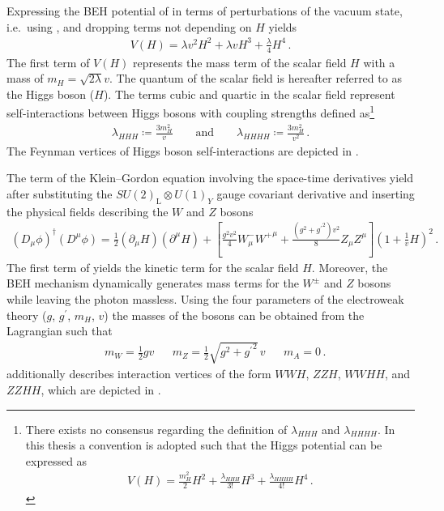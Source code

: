 Expressing the BEH potential of  in terms of
perturbations of the vacuum state, i.e.\ using ,
and dropping terms not depending on $H$ yields
\begin{align}
  V(H) =
  \lambda v^2 H^2
  + \lambda v H^3
  + \frac{\lambda}{4} H^4 \,\text{.}
  \label{eq:beh_potential}
\end{align}
The first term of $V(H)$ represents the mass term of the scalar field $H$ with a
mass of $m_H = \sqrt{2\lambda} v$. The quantum of the scalar field is hereafter
referred to as the Higgs boson ($H$). The terms cubic and quartic in the scalar
field represent self-interactions between Higgs bosons with coupling strengths
defined as\footnote{There exists no consensus regarding the definition of
  $\lambda_{HHH}$ and $\lambda_{HHHH}$. In this thesis a convention is adopted
  such that the Higgs potential can be expressed as
  \begin{align*}
    V(H) = \frac{m_{H}^2}{2} H^2 + \frac{\lambda_{HHH}}{3!} H^3 + \frac{\lambda_{HHHH}}{4!}
    H^4 \,\text{.}
  \end{align*}
}
\begin{align*}
  \lambda_{HHH} \coloneqq \frac{3 m_{H}^2}{v} \qquad \text{and} \qquad \lambda_{HHHH} \coloneqq \frac{3 m_{H}^2}{v^2} \,\text{.}
\end{align*}
The Feynman vertices of Higgs boson self-interactions are depicted in
.

The term of the Klein--Gordon equation involving the space-time derivatives
yield after substituting the $SU(2)_{\text{L}} \otimes U(1)_Y$ gauge covariant
derivative and inserting the physical fields describing the $W$ and $Z$ bosons
\begin{align}
  (D_\mu \phi)^\dagger (D^\mu \phi) =
  \frac{1}{2} (\partial_\mu H) (\partial^\mu H)
  + \left[
  \frac{g^2 v^2}{4} W^{-}_\mu {W^{+}}^\mu
  +
  \frac{(g^2 + {g^\prime}^2) v^2}{8} Z_\mu Z^\mu
  \right] \left( 1 + \frac{1}{v} H \right)^2 \,\text{.}
  \label{eq:higgs_covariant_derivative}
\end{align}
The first term of  yields the kinetic term
for the scalar field $H$. Moreover, the BEH mechanism dynamically generates mass
terms for the $W^\pm$ and $Z$ bosons while leaving the photon massless. Using
the four parameters of the electroweak theory ($g$, $g^\prime$, $m_{H}$, $v$)
the masses of the bosons can be obtained from the Lagrangian such that
\begin{align*}
  &m_W = \frac{1}{2} g v  &&m_Z = \frac{1}{2} \sqrt{g^2 + {g^\prime}^2} \, v && m_A = 0 \,\text{.}
\end{align*}
 additionally describes interaction vertices
of the form $WWH$, $ZZH$, $WWHH$, and $ZZHH$, which are depicted in
.

